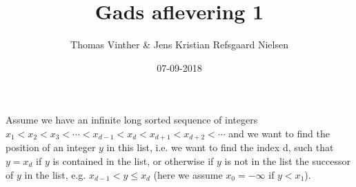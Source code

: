\documentclass{article}
\theoremstyle{remark}
\numberwithin{equation}{section}
\begin{document}
	\author{Thomas Vinther \& Jens Kristian Refsgaard Nielsen}
	\title{Gads aflevering 1}
	\date{07-09-2018}
	\maketitle
\section*{}
Assume we have an infinite long sorted sequence of integers $x_1 < x_2 < x_3 < \cdots < x_{d-1} < x_d < x_{d+1} < x_{d+2} < \cdots$ and we want to find the position of an integer $y$ in this list, i.e. we want to find the index d, such that $y = x_d$ if $y$ is contained in the list, or otherwise if $y$ is not in the list the successor of $y$ in the list, e.g. $x_{d-1} < y \leq x_d$ (here we assume $x_0 = -\infty$ if $y < x_1$).
\end{document}
